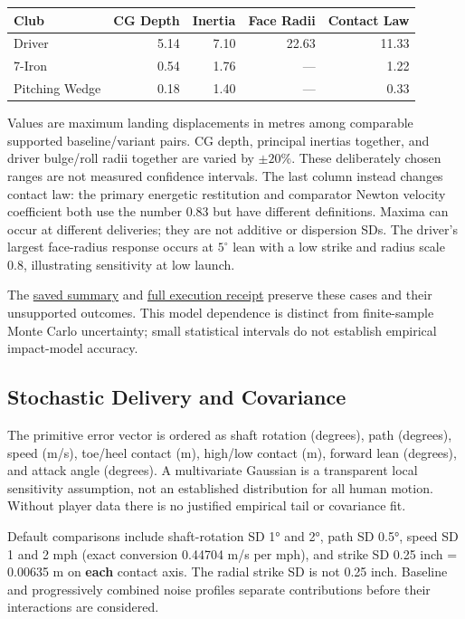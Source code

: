\documentclass[
]{article}
\begin{document}
\begin{center}
\begin{tabular}{lrrrr}
\toprule
Club & CG Depth & Inertia & Face Radii & Contact Law\\
\midrule
Driver & 5.14 & 7.10 & 22.63 & 11.33\\
7-Iron & 0.54 & 1.76 & --- & 1.22\\
Pitching Wedge & 0.18 & 1.40 & --- & 0.33\\
\bottomrule
\end{tabular}
\end{center}
Values are maximum landing displacements in metres among comparable supported
baseline/variant pairs. CG depth, principal inertias together, and driver
bulge/roll radii together are varied by $\pm20\%$. These deliberately chosen
ranges are not measured confidence intervals. The last column instead changes
contact law: the primary energetic restitution and comparator Newton velocity
coefficient both use the number 0.83 but have different definitions. Maxima
can occur at different deliveries; they are not additive or dispersion SDs.
The driver's largest face-radius response occurs at $5^\circ$ lean with a low
strike and radius scale 0.8, illustrating sensitivity at low launch.

The \href{validation/independent_head_sensitivity_summary.json}{saved
summary} and \href{validation/independent_head_sensitivity.json}{full
execution receipt} preserve these cases and their unsupported outcomes.
This model dependence is distinct from finite-sample Monte Carlo uncertainty;
small statistical intervals do not establish empirical impact-model accuracy.

\subsection{Stochastic Delivery and
Covariance}\label{stochastic-delivery-and-covariance}

The primitive error vector is ordered as shaft rotation (degrees), path
(degrees), speed (m/s), toe/heel contact (m), high/low contact (m),
forward lean (degrees), and attack angle (degrees). A multivariate
Gaussian is a transparent local sensitivity assumption, not an
established distribution for all human motion. Without player data there
is no justified empirical tail or covariance fit.

Default comparisons include shaft-rotation SD 1° and 2°, path SD 0.5°,
speed SD 1 and 2 mph (exact conversion 0.44704 m/s per mph), and strike
SD 0.25 inch = 0.00635 m on \textbf{each} contact axis. The radial
strike SD is not 0.25 inch. Baseline and progressively combined noise
profiles separate contributions before their interactions are
considered.
\end{document}
